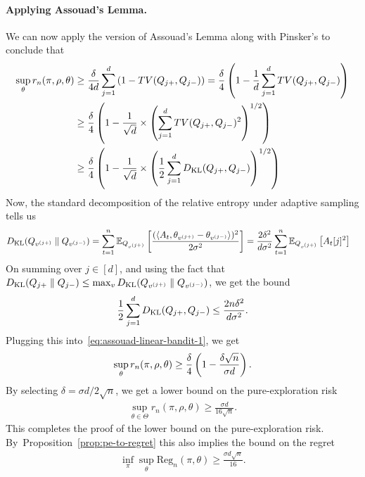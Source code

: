 \documentclass[12pt]{article}
\begin{document}
\paragraph{Applying Assouad's Lemma.} We can now apply the version of Assouad's Lemma along with Pinsker's to conclude that 
\begin{align}
\sup_{\theta} r_n(\pi, \rho, \theta) &\geq \frac{\delta}{4d} \sum_{j=1}^d \left( 1 - TV(Q_{j+}, Q_{j-}) \right)  = \frac{\delta}{4} \left( 1 - \frac{1}{d} \sum_{j=1}^d TV(Q_{j+}, Q_{j-}) \right) \\ 
& \geq \frac{\delta}{4} \left( 1 - \frac{1}{\sqrt{d}}  \times \left( \sum_{j=1}^d TV(Q_{j+}, Q_{j-})^2 \right)^{1/2} \right) \\
& \geq \frac{\delta}{4} \left( 1 - \frac{1}{\sqrt{d}}  \times \left( \frac{1}{2}\sum_{j=1}^d D_{\text{KL}}(Q_{j+}, Q_{j-}) \right)^{1/2} \right) 
\label{eq:assouad-linear-bandit-1}
\end{align}
Now, the standard decomposition of the relative entropy under adaptive sampling tells us 
\begin{align}
D_{\text{KL}}(Q_{v^{(j+)}} \parallel Q_{v^{(j-)}}) &= \sum_{t=1}^n \mathbb{E}_{Q_{v^{(j+)}}} \left[ \frac{ ( \langle A_t, \theta_{v^{(j+)}} - \theta_{v^{(j-)}} \rangle )^2}{2 \sigma^2} \right] = \frac{2 \delta^2}{d \sigma^2} \sum_{t=1}^n \mathbb{E}_{Q_{v^{(j+)}}} \left[ A_{t}[j]^2 \right] 
\end{align}
On summing over $j \in [d]$, and using the fact that $D_{\text{KL}}(Q_{j+} \parallel Q_{j-}) \leq \max_{v} D_{\text{KL}}(Q_{v^{(j+)}} \parallel Q_{v^{(j-)}})$, we get the bound 
\begin{align}
\frac{1}{2}\sum_{j=1}^d D_{\text{KL}}(Q_{j+}, Q_{j-}) \leq \frac{2n \delta^2}{d \sigma^2}. 
\end{align}
Plugging this into~\eqref{eq:assouad-linear-bandit-1}, we get 
\begin{align}
\sup_{\theta} r_n(\pi, \rho, \theta) \geq \frac{\delta}{4} \left( 1 - \frac{\delta \sqrt{n}}{\sigma d }  \right).  
\end{align}
By selecting $\delta = \sigma d/ 2\sqrt{n}$, we get a lower bound on the pure-exploration risk 
\begin{align}
\sup_{\theta \in \Theta} r_n(\pi, \rho, \theta) \geq \frac{\sigma d}{16 \sqrt{n}}. 
\end{align}
This completes the proof of the lower bound on the pure-exploration risk. By~Proposition~\ref{prop:pe-to-regret} this also implies the bound on the regret 
\begin{align}
\inf_{\pi} \sup_{\theta} \mathrm{Reg}_n(\pi, \theta) \geq \frac{\sigma d \sqrt{n}}{16}. 
\end{align}

\end{document}
